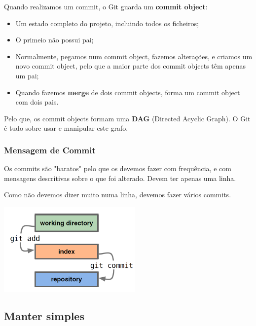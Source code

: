 \documentclass{article}
\begin{document}
Quando realizamos um commit, o Git guarda um \textbf{commit object}:
\begin{itemize}
  \item Um estado completo do projeto, incluindo todos os ficheiros;
  \item O primeio não possui pai;
  \item Normalmente, pegamos num commit object, fazemos alterações,
  e criamos um novo commit object, pelo que a maior parte dos commit objects
  têm apenas um pai;
  \item Quando fazemos \textbf{merge} de dois commit objects,
  forma um commit object com dois pais.
\end{itemize}

Pelo que, os commit objects formam uma \textbf{DAG} (Directed Acyclic Graph).
O Git é tudo sobre usar e manipular este grafo.

\subsubsection{Mensagem de Commit}

Os commits são "baratos" pelo que os devemos fazer com frequência, e com
mensagens descritivas sobre o que foi alterado. Devem ter apenas uma linha.

Como não devemos dizer muito numa linha, devemos fazer vários commits.

\begin{center}
  \includegraphics[scale=0.6]{5}
\end{center}

\subsection{Manter simples}
\end{document}

